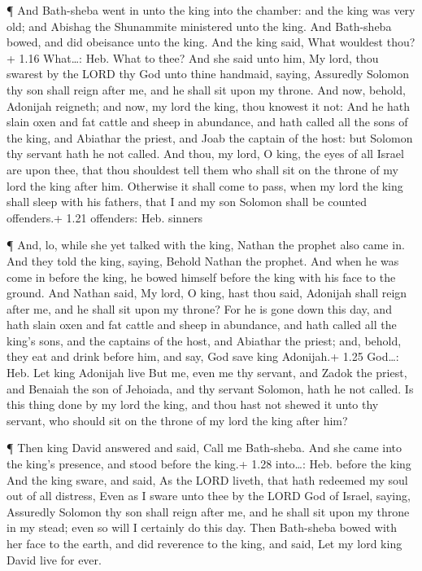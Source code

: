  ¶ And Bath-sheba went in unto the king into the chamber:
and the king was very old; and Abishag the Shunammite ministered unto
the king.  And Bath-sheba bowed, and did obeisance unto the
king. And the king said, What wouldest thou?+ 1.16 What\ldots: Heb. What
to thee?  And she said unto him, My lord, thou swarest by
the LORD thy God unto thine handmaid, saying, Assuredly Solomon thy son
shall reign after me, and he shall sit upon my throne.  And
now, behold, Adonijah reigneth; and now, my lord the king, thou knowest
it not:  And he hath slain oxen and fat cattle and sheep in
abundance, and hath called all the sons of the king, and Abiathar the
priest, and Joab the captain of the host: but Solomon thy servant hath
he not called.  And thou, my lord, O king, the eyes of all
Israel are upon thee, that thou shouldest tell them who shall sit on the
throne of my lord the king after him.  Otherwise it shall
come to pass, when my lord the king shall sleep with his fathers, that I
and my son Solomon shall be counted offenders.+ 1.21 offenders: Heb.
sinners

 ¶ And, lo, while she yet talked with the king, Nathan the
prophet also came in.  And they told the king, saying,
Behold Nathan the prophet. And when he was come in before the king, he
bowed himself before the king with his face to the ground. 
And Nathan said, My lord, O king, hast thou said, Adonijah shall reign
after me, and he shall sit upon my throne?  For he is gone
down this day, and hath slain oxen and fat cattle and sheep in
abundance, and hath called all the king's sons, and the captains of the
host, and Abiathar the priest; and, behold, they eat and drink before
him, and say, God save king Adonijah.+ 1.25 God\ldots: Heb. Let king
Adonijah live  But me, even me thy servant, and Zadok the
priest, and Benaiah the son of Jehoiada, and thy servant Solomon, hath
he not called.  Is this thing done by my lord the king, and
thou hast not shewed it unto thy servant, who should sit on the throne
of my lord the king after him?

 ¶ Then king David answered and said, Call me Bath-sheba.
And she came into the king's presence, and stood before the king.+ 1.28
into\ldots: Heb. before the king  And the king sware, and
said, As the LORD liveth, that hath redeemed my soul out of all
distress,  Even as I sware unto thee by the LORD God of
Israel, saying, Assuredly Solomon thy son shall reign after me, and he
shall sit upon my throne in my stead; even so will I certainly do this
day.  Then Bath-sheba bowed with her face to the earth, and
did reverence to the king, and said, Let my lord king David live for
ever.

